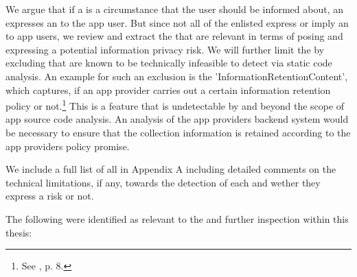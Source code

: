 We argue that if a \ipp is a circumstance that the user should be informed about, an \ipp expresses an \ipr to the app user.
But since not all of the enlisted \ipp express or imply an \ipr to app users, we review and extract the \ipp that are relevant in terms of posing and expressing a potential information privacy risk.
We will further limit the \ipp by excluding \ipp that are known to be technically infeasible to detect via static code analysis.
An example for such an exclusion is the \ipp 'InformationRetentionContent', which captures, if an app provider carries out a certain information retention policy or not.\footnote{See \cite{Dehling2016}, p. 8.}
This is a feature that is undetectable by \sca and beyond the scope of app source code analysis.
An analysis of the app providers backend system would be necessary to ensure that the collection information is retained according to the app providers policy promise.

We include a full list of all \ipp in Appendix A including detailed comments on the technical limitations, if any, towards the \sca detection of each \ipp and wether they express a risk or not.

The following \ipp were identified as relevant to the \sca and further inspection within this thesis:

